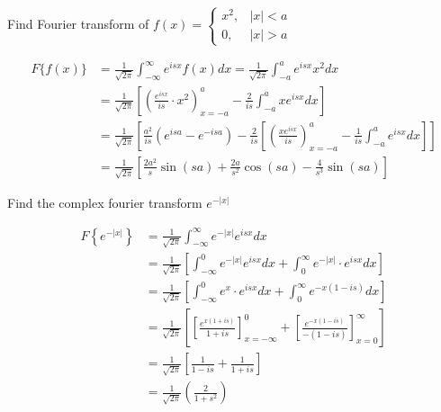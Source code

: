 \begin{exercise}
	Find Fourier transform of $f(x)= \begin{cases}x^{2}, & |x|<a \\ 0, & |x|>a\end{cases}$
\end{exercise}
\begin{answer}
	\begin{align*}
	F\{f(x)\} &=\frac{1}{\sqrt{2 \pi}} \int_{-\infty}^{\infty} e^{i s x} f(x) d x=\frac{1}{\sqrt{2 \pi}} \int_{-a}^{a} e^{i s x} x^{2} d x \\
	&=\frac{1}{\sqrt{2 \pi}}\left[\left(\frac{e^{i s x}}{i s} \cdot x^{2}\right)_{x=-a}^{a}-\frac{2}{i s} \int_{-a}^{a} x e^{i s x} d x\right] \\
	&=\frac{1}{\sqrt{2 \pi}}\left[\frac{a^{2}}{i s}\left(e^{i s a}-e^{-i s a}\right)-\frac{2}{i s}\left[\left(\frac{x e^{i s x}}{i s}\right)_{x=-a}^{a}-\frac{1}{i s} \int_{-a}^{a} e^{i s x} d x\right]\right]\\
	&=\frac{1}{\sqrt{2 \pi}}\left[\frac{2 a^{2}}{s} \sin (s a)+\frac{2 a}{s^{2}} \cos (s a)-\frac{4}{s^{3}} \sin (s a)\right]
	\end{align*}
\end{answer}
\begin{exercise}
	Find the complex fourier transform $e^{-|x|}$
\end{exercise}
\begin{answer}
	\begin{align*}
	F\left\{e^{-|x|}\right\}&=\frac{1}{\sqrt{2 \pi}} \int_{-\infty}^{\infty} e^{-|x|} e^{i s x} d x\\&=\frac{1}{\sqrt{2 \pi}}\left[\int_{-\infty}^{0} e^{-|x|} e^{i s x} d x+\int_{0}^{\infty} e^{-|x|} \cdot e^{i s x} d x\right]\\
	&=\frac{1}{\sqrt{2 \pi}}\left[\int_{-\infty}^{0} e^{x} \cdot e^{i s x} d x+\int_{0}^{\infty} e^{-x(1-i s)} d x\right]\\&=\frac{1}{\sqrt{2 \pi}}\left[\left[\frac{e^{x(1+i s)}}{1+i s}\right]_{x=-\infty}^{0}+\left[\frac{e^{-x(1-i s)}}{-(1-i s)}\right]_{x=0}^{\infty}\right] \\
	&=\frac{1}{\sqrt{2 \pi}}\left[\frac{1}{1-i s}+\frac{1}{1+i s}\right]\\&=\frac{1}{\sqrt{2 \pi}}\left(\frac{2}{1+s^{2}}\right)
	\end{align*}
\end{answer}


